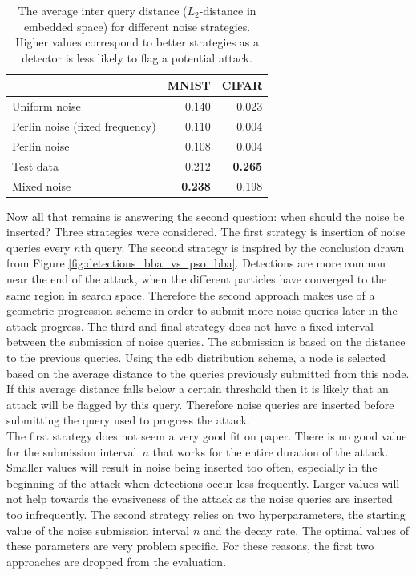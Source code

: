 \begin{table}
\centering
\caption[The average inter query distances for different types of noise]{The average inter query distance ($L_2$-distance in embedded space) for different noise strategies. Higher values correspond to better strategies as a detector is less likely to flag a potential attack.}
\label{tbl:noise_distances}
\begin{tabular}{lrr}\toprule
	&MNIST &CIFAR \\ \midrule
Uniform noise&0.140&0.023\\ 
Perlin noise (fixed frequency)&0.110&0.004\\ 
Perlin noise&0.108&0.004\\ 
Test data&0.212&\textbf{0.265}\\ 
Mixed noise&\textbf{0.238}&0.198\\ \bottomrule
\end{tabular}
\end{table}

Now all that remains is answering the second question: when should the noise be inserted? Three strategies were considered. The first strategy is insertion of noise queries every $n$th query. The second strategy is inspired by the conclusion drawn from Figure \ref{fig:detections_bba_vs_pso_bba}. Detections are more common near the end of the attack, when the different particles have converged to the same region in search space. Therefore the second approach makes use of a geometric progression scheme \cite{geometric_progression} in order to submit more noise queries later in the attack progress. The third and final strategy does not have a fixed interval between the submission of noise queries. The submission is based on the distance to the previous queries. Using the \gls{edb} distribution scheme, a node is selected based on the average distance to the queries previously submitted from this node. If this average distance falls below a certain threshold then it is likely that an attack will be flagged by this query. Therefore noise queries are inserted before submitting the query used to progress the attack.\\

The first strategy does not seem a very good fit on paper. There is no good value for the submission interval~$n$ that works for the entire duration of the attack. Smaller values will result in noise being inserted too often, especially in the beginning of the attack when detections occur less frequently. Larger values will not help towards the evasiveness of the attack as the noise queries are inserted too infrequently. The second strategy relies on two hyperparameters, the starting value of the noise submission interval $n$ and the decay rate. The optimal values of these parameters are very problem specific. For these reasons, the first two approaches are dropped from the evaluation.\\

